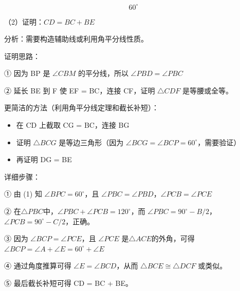 \[
\boxed{60^\circ}
\]

\bigskip

（2）证明：\(CD = BC + BE\)

分析：需要构造辅助线或利用角平分线性质。

证明思路：

① 因为 BP 是 \(\angle CBM\) 的平分线，所以 \(\angle PBD = \angle PBC\)

② 延长 BE 到 F 使 EF = BC，连接 CF，证明 \(\triangle CDF\) 是等腰或全等。

更简洁的方法（利用角平分线定理和截长补短）：

\begin{itemize}
\item 在 CD 上截取 CG = BC，连接 BG
\item 证明 \(\triangle BCG\) 是等边三角形（因为 \(\angle BCG = \angle BCP = 60^\circ\)，需要验证）
\item 再证明 DG = BE
\end{itemize}

详细步骤：

① 由 (1) 知 \(\angle BPC = 60^\circ\)，且 \(\angle PBC = \angle PBD\)，\(\angle PCB = \angle PCE\)

② 在\(\triangle PBC\)中，\(\angle PBC + \angle PCB = 120^\circ\)，而 \(\angle PBC = 90^\circ - B/2\)，\(\angle PCB = 90^\circ - C/2\)，正确。

③ 因为 \(\angle BCP = \angle PCE\)，且 \(\angle PCE\) 是\(\triangle ACE\)的外角，可得 \(\angle BCP = \angle A + \angle E = 60^\circ + \angle E\)

④ 通过角度推算可得 \(\angle E = \angle BCD\)，从而 \(\triangle BCE \cong \triangle DCF\) 或类似。

⑤ 最后截长补短可得 CD = BC + BE。
